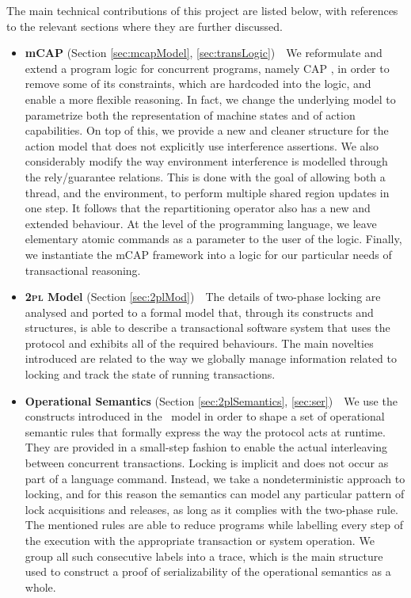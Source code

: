 The main technical contributions of this project are listed below, with references to the relevant sections where they are further discussed.
\begin{itemize}
	\item \textbf{mCAP} (Section \ref{sec:mcapModel}, \ref{sec:transLogic})\ \ We reformulate and extend a program logic for concurrent programs, namely CAP \cite{cap}, in order to remove some of its constraints, which are hardcoded into the logic, and enable a more flexible reasoning. In fact, we change the underlying model to parametrize both the representation of machine states and of action capabilities. On top of this, we provide a new and cleaner structure for the action model that does not explicitly use interference assertions. We also considerably modify the way environment interference is modelled through the rely/guarantee relations. This is done with the goal of allowing both a thread, and the environment, to perform multiple shared region updates in one step. It follows that the repartitioning operator also has a new and extended behaviour. At the level of the programming language, we leave elementary atomic commands as a parameter to the user of the logic. Finally, we instantiate the mCAP framework into a logic for our particular needs of transactional reasoning.
	
	\item \textbf{\textsc{2pl} Model} (Section \ref{sec:2plMod})\ \ The details of two-phase locking are analysed and ported to a formal model that, through its constructs and structures, is able to describe a transactional software system that uses the protocol and exhibits all of the required behaviours. The main novelties introduced are related to the way we globally manage information related to locking and track the state of running transactions.
	
	\item \textbf{Operational Semantics} (Section \ref{sec:2plSemantics}, \ref{sec:ser})\ \ We use the constructs introduced in the \tpl\ model in order to shape a set of operational semantic rules that formally express the way the protocol acts at runtime. They are provided in a small-step fashion to enable the actual interleaving between concurrent transactions. Locking is implicit and does not occur as part of a language command. Instead, we take a nondeterministic approach to locking, and for this reason the semantics can model any particular pattern of lock acquisitions and releases, as long as it complies with the two-phase rule. The mentioned rules are able to reduce programs while labelling every step of the execution with the appropriate transaction or system operation. We group all such consecutive labels into a trace, which is the main structure used to construct a proof of serializability of the operational semantics as a whole. 
	

\end{itemize}
